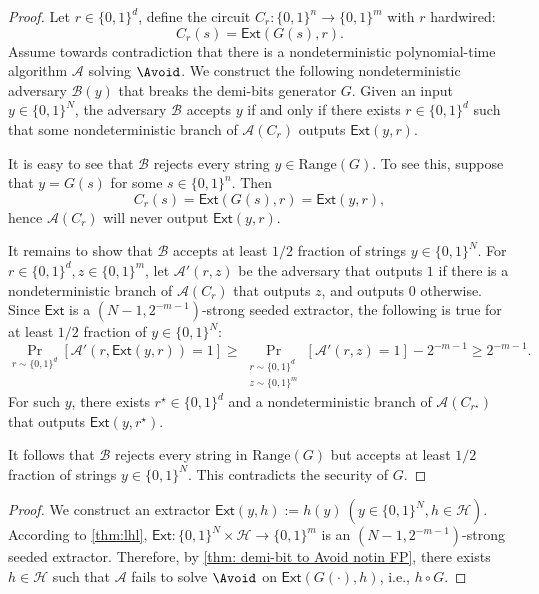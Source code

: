 \documentclass[10pt,a4paper]{article}
\theoremstyle{definition}
\theoremstyle{remark}
\newcommand{\Ext}{\mathsf{Ext}}
\newcommand{\calA}{\mathcal{A}}
\newcommand{\calB}{\mathcal{B}}
\newcommand{\calH}{\mathcal{H}}
\newcommand{\Range}{\mathrm{Range}}
\begin{document}
\begin{proof}
	Let $r \in \{0, 1\}^d$, define the circuit $C_r: \{0, 1\}^n \to \{0, 1\}^m$ with $r$ hardwired:
	\[C_r(s) = \Ext(G(s), r).\]
	Assume towards contradiction that there is a nondeterministic polynomial-time algorithm $\calA$ solving $\Avoid$. We construct the following nondeterministic adversary $\calB(y)$ that breaks the demi-bits generator $G$. Given an input $y \in \{0, 1\}^N$, the adversary $\calB$ accepts $y$ if and only if there exists $r \in \{0, 1\}^d$ such that some nondeterministic branch of $\calA(C_r)$ outputs $\Ext(y, r)$.

	It is easy to see that $\calB$ rejects every string $y\in\Range(G)$. To see this, suppose that $y = G(s)$ for some $s \in \{0, 1\}^n$. Then
	\[C_r(s) = \Ext(G(s), r) = \Ext(y, r),\]
	hence $\calA(C_r)$ will never output $\Ext(y, r)$.

	It remains to show that $\calB$ accepts at least $1/2$ fraction of strings $y \in \{0, 1\}^N$. For $r\in \{0, 1\}^d, z\in\{0, 1\}^m$, let $\calA'(r, z)$ be the adversary that outputs $1$ if there is a nondeterministic branch of $\calA(C_r)$ that outputs $z$, and outputs $0$ otherwise. Since $\Ext$ is a $(N-1, 2^{-m-1})$-strong seeded extractor, %
    the following is true for at least $1/2$ fraction of $y \in \{0, 1\}^N$:
	\[\Pr_{r\sim \{0, 1\}^d}[\calA'(r, \Ext(y, r)) = 1] \ge \Pr_{\substack{r\sim \{0, 1\}^d\\z\sim \{0, 1\}^m}}[\calA'(r, z) = 1] - 2^{-m-1} \ge 2^{-m-1}.\]
	For such $y$, there exists $r^\star\in \{0, 1\}^d$ and a nondeterministic branch of $\calA(C_{r^\star})$ that outputs $\Ext(y, r^\star)$.
	
	It follows that $\calB$ rejects every string in $\Range(G)$ but accepts at least $1/2$ fraction of strings $y\in \{0, 1\}^N$. This contradicts the security of $G$.
\end{proof}


\ThmDemiBitsPlusHash*
\begin{proof}
    We construct an extractor
    \(\Ext(y,h):=h(y)~(y\in\{0,1\}^N,h\in\calH)\). 
    According to \autoref{thm:lhl}, $\Ext\colon\{0,1\}^N\times\calH\to\{0,1\}^m$ is an $(N-1,2^{-m-1})$-strong seeded extractor. Therefore, by \autoref{thm: demi-bit to Avoid notin FP}, there exists $h\in\calH$ such that $\calA$ fails to solve $\Avoid$ on $\Ext(G(\cdot),h)$, i.e., $h\circ G$.
\end{proof}
\end{document}
